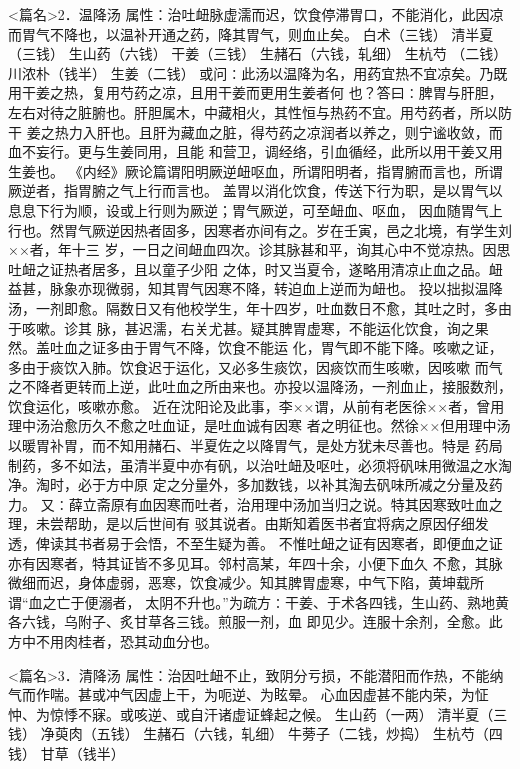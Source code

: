 \documentclass[a4paper,12pt,UTF8,twoside]{ctexbook}
\begin{document}
<篇名>2．温降汤
属性：治吐衄脉虚濡而迟，饮食停滞胃口，不能消化，此因凉而胃气不降也，以温补开通之药，降其胃气，则血止矣。 
白术（三钱） 清半夏（三钱） 生山药（六钱） 干姜（三钱） 生赭石（六钱，轧细） 生杭芍 
（二钱） 川浓朴（钱半） 生姜（二钱） 
或问∶此汤以温降为名，用药宜热不宜凉矣。乃既用干姜之热，复用芍药之凉，且用干姜而更用生姜者何 
也？答曰∶脾胃与肝胆，左右对待之脏腑也。肝胆属木，中藏相火，其性恒与热药不宜。用芍药者，所以防干 
姜之热力入肝也。且肝为藏血之脏，得芍药之凉润者以养之，则宁谧收敛，而血不妄行。更与生姜同用，且能 
和营卫，调经络，引血循经，此所以用干姜又用生姜也。 
《内经》厥论篇谓阳明厥逆衄呕血，所谓阳明者，指胃腑而言也，所谓厥逆者，指胃腑之气上行而言也。 
盖胃以消化饮食，传送下行为职，是以胃气以息息下行为顺，设或上行则为厥逆；胃气厥逆，可至衄血、呕血， 
因血随胃气上行也。然胃气厥逆因热者固多，因寒者亦间有之。岁在壬寅，邑之北境，有学生刘××者，年十三 
岁，一日之间衄血四次。诊其脉甚和平，询其心中不觉凉热。因思吐衄之证热者居多，且以童子少阳 
之体，时又当夏令，遂略用清凉止血之品。衄益甚，脉象亦现微弱，知其胃气因寒不降，转迫血上逆而为衄也。 
投以拙拟温降汤，一剂即愈。隔数日又有他校学生，年十四岁，吐血数日不愈，其吐之时，多由于咳嗽。诊其 
脉，甚迟濡，右关尤甚。疑其脾胃虚寒，不能运化饮食，询之果然。盖吐血之证多由于胃气不降，饮食不能运 
化，胃气即不能下降。咳嗽之证，多由于痰饮入肺。饮食迟于运化，又必多生痰饮，因痰饮而生咳嗽，因咳嗽 
而气之不降者更转而上逆，此吐血之所由来也。亦投以温降汤，一剂血止，接服数剂，饮食运化，咳嗽亦愈。 
近在沈阳论及此事，李××谓，从前有老医徐××者，曾用理中汤治愈历久不愈之吐血证，是吐血诚有因寒 
者之明征也。然徐××但用理中汤以暖胃补胃，而不知用赭石、半夏佐之以降胃气，是处方犹未尽善也。特是 
药局制药，多不如法，虽清半夏中亦有矾，以治吐衄及呕吐，必须将矾味用微温之水淘净。淘时，必于方中原 
定之分量外，多加数钱，以补其淘去矾味所减之分量及药力。 
又∶薛立斋原有血因寒而吐者，治用理中汤加当归之说。特其因寒致吐血之理，未尝帮助，是以后世间有 
驳其说者。由斯知着医书者宜将病之原因仔细发透，俾读其书者易于会悟，不至生疑为善。 
不惟吐衄之证有因寒者，即便血之证亦有因寒者，特其证皆不多见耳。邻村高某，年四十余，小便下血久 
不愈，其脉微细而迟，身体虚弱，恶寒，饮食减少。知其脾胃虚寒，中气下陷，黄坤载所谓“血之亡于便溺者， 
太阴不升也。”为疏方∶干姜、于术各四钱，生山药、熟地黄各六钱，乌附子、炙甘草各三钱。煎服一剂，血 
即见少。连服十余剂，全愈。此方中不用肉桂者，恐其动血分也。 


<篇名>3．清降汤
属性：治因吐衄不止，致阴分亏损，不能潜阳而作热，不能纳气而作喘。甚或冲气因虚上干，为呃逆、为眩晕。 
心血因虚甚不能内荣，为怔忡、为惊悸不寐。或咳逆、或自汗诸虚证蜂起之候。 
生山药（一两） 清半夏（三钱） 净萸肉（五钱） 生赭石（六钱，轧细） 牛蒡子（二钱，炒捣） 
生杭芍（四钱） 甘草（钱半） 
\end{document}
